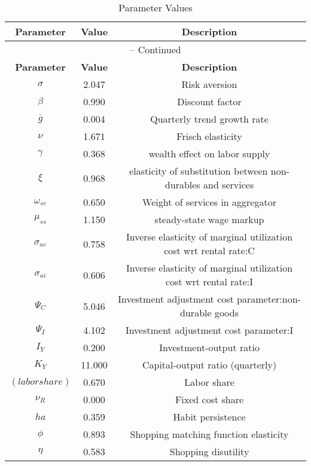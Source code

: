 \begin{center}
\begin{longtable}{ccc}
\caption{Parameter Values}\\%
\toprule%
\multicolumn{1}{c}{\textbf{Parameter}} &
\multicolumn{1}{c}{\textbf{Value}} &
 \multicolumn{1}{c}{\textbf{Description}}\\%
\midrule%
\endfirsthead
\multicolumn{3}{c}{{\tablename} \thetable{} -- Continued}\\%
\midrule%
\multicolumn{1}{c}{\textbf{Parameter}} &
\multicolumn{1}{c}{\textbf{Value}} &
  \multicolumn{1}{c}{\textbf{Description}}\\%
\midrule%
\endhead
${\sigma}$ 	 & 	 2.047 	 & 	 Risk aversion\\
${\beta}$ 	 & 	 0.990 	 & 	 Discount factor\\
${\overline{g}}$ 	 & 	 0.004 	 & 	 Quarterly trend growth rate\\
$\nu$ 	 & 	 1.671 	 & 	 Frisch elasticity\\
$\gamma$ 	 & 	 0.368 	 & 	 wealth effect on labor supply\\
$\xi$ 	 & 	 0.968 	 & 	 elasticity of substitution between non-durables and services\\
$\omega_{sc}$ 	 & 	 0.650 	 & 	 Weight of services in aggregator\\
$\mu_{ss}$ 	 & 	 1.150 	 & 	 steady-state wage markup\\
${\sigma_{ac}}$ 	 & 	 0.758 	 & 	 Inverse elasticity of marginal utilization cost wrt rental rate:C\\
${\sigma_{ai}}$ 	 & 	 0.606 	 & 	 Inverse elasticity of marginal utilization cost wrt rental rate:I\\
${\Psi_{C}}$ 	 & 	 5.046 	 & 	 Investment adjustment cost parameter:non-durable goods\\
${\Psi_I}$ 	 & 	 4.102 	 & 	 Investment adjustment cost parameter:I\\
${I_Y}$ 	 & 	 0.200 	 & 	 Investment-output ratio\\
${K_Y}$ 	 & 	 11.000 	 & 	 Capital-output ratio (quarterly)\\
$(labor share)$ 	 & 	 0.670 	 & 	 Labor share\\
${\nu_R}$ 	 & 	 0.000 	 & 	 Fixed cost share\\
${ha}$ 	 & 	 0.359 	 & 	 Habit persistence\\
${\phi}$ 	 & 	 0.893 	 & 	 Shopping matching function elasticity\\
${\eta}$ 	 & 	 0.583 	 & 	 Shopping disutility\\

\end{longtable}
\end{center}
